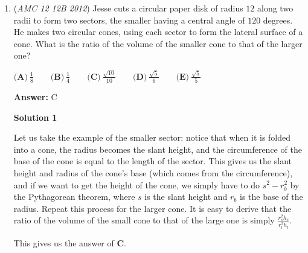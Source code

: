 \begin{enumerate}
\textbf{Solution 4}

If Bernardo is to win, he must produce a number $n$ such that $n \geq 950$. This would mean Silvia would have to hand him a number $r$ such that $r \geq \frac{950}{2}=475$. This means Bernardo would have to give Silvia a number $s$ such that $s \geq 475-50=425$. Repeating this process gives the following sequence: 
 \[B=213, S=163, B=82, S=32, B=16\] Thus, the smallest possible value is $16$ and the answer is $1+6=\boxed{\textbf{(A)}7}$

            \begin{itemize}
        \item Note: For all the values of $B$ and $S$, we always round up a value if the inequality gives a fraction, since we're using the $\geq$                inequality.
            \end{itemize}
            


	\item (\textit{AMC 12 12B 2012}) Jesse cuts a circular paper disk of radius $12$ along two radii to form two sectors, the smaller having a central angle of $120$ degrees. He makes two circular cones, using each sector to form the lateral surface of a cone. What is the ratio of the volume of the smaller cone to that of the larger one?


 $\textbf{(A)}\ \frac{1}{8}\qquad\textbf{(B)}\ \frac{1}{4}\qquad\textbf{(C)}\ \frac{\sqrt{10}}{10}\qquad\textbf{(D)}\ \frac{\sqrt{5}}{6}\qquad\textbf{(E)}\ \frac{\sqrt{5}}{5}$

 \textbf{Answer: }C



\textbf{Solution 1}

Let us take the example of the smaller sector: notice that when it is folded into a cone, the radius becomes the slant height, and the circumference of the base of the cone is equal to the length of the sector. This gives us the slant height and radius of the cone's base (which comes from the circumference), and if we want to get the height of the cone, we simply have to do $s^2 - r_b^2$ by the Pythagorean theorem, where $s$ is the slant height and $r_b$ is the base of the radius. Repeat this process for the larger cone. It is easy to derive that the ratio of the volume of the small cone to that of the large one is simply $\frac{r_s^2h_s}{r_l^2h_l}$. 

 This gives us the answer of $\boxed{\mathbf{C}}$. 

 




\end{enumerate}
